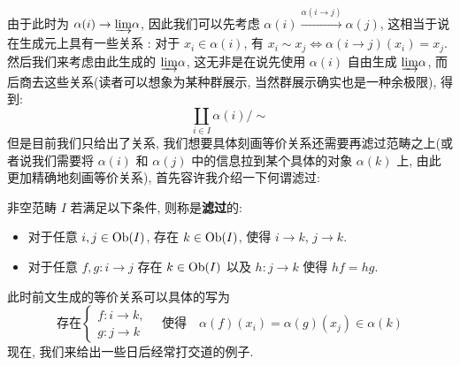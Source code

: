 由于此时为 $\alpha(i) \to \underrightarrow{\lim} \alpha$, 因此我们可以先考虑 $\alpha(i) \xrightarrow{\alpha(i\to j)}\alpha(j)$, 这相当于说在生成元上具有一些关系 : 对于 $x_i \in \alpha(i)$, 有 $x_i \sim x_j \Leftrightarrow \alpha(i\to j)(x_i) = x_j$. \\
然后我们来考虑由此生成的 $\underrightarrow{\lim} \alpha$, 这无非是在说先使用 $\alpha(i)$ 自由生成 $\underrightarrow{\lim} \alpha$, 而后商去这些关系(读者可以想象为某种群展示, 当然群展示确实也是一种余极限), 得到:
\[
    \coprod_{i\in I} \alpha(i) /\sim
\]
但是目前我们只给出了关系, 我们想要具体刻画等价关系还需要再滤过范畴之上(或者说我们需要将 $\alpha(i)$ 和 $\alpha(j)$ 中的信息拉到某个具体的对象 $\alpha(k)$ 上, 由此更加精确地刻画等价关系), 首先容许我介绍一下何谓滤过:
\begin{definition}[滤过]
    非空范畴 $I$ 若满足以下条件, 则称是\textbf{滤过}的:
    \begin{itemize}
        \item 对于任意 $i,j \in \operatorname{Ob}(I)$, 存在 $k \in \operatorname{Ob}(I)$, 使得 $i \to k$, $j \to k$.
        \item 对于任意 $f,g \colon i \to j$ 存在 $k \in \operatorname{Ob}(I)$ 以及 $h \colon j \to k$ 使得 $hf = hg$.
    \end{itemize}
\end{definition}
此时前文生成的等价关系可以具体的写为
\[
   \text{存在}\left\{
   \begin{array}{cc}
       f\colon i \to k ,  \\
       g \colon j \to k 
   \end{array}\right.
   \quad \text{使得} \quad \alpha(f)(x_i) = \alpha(g)(x_j)\in \alpha(k)
\]
现在, 我们来给出一些日后经常打交道的例子.
